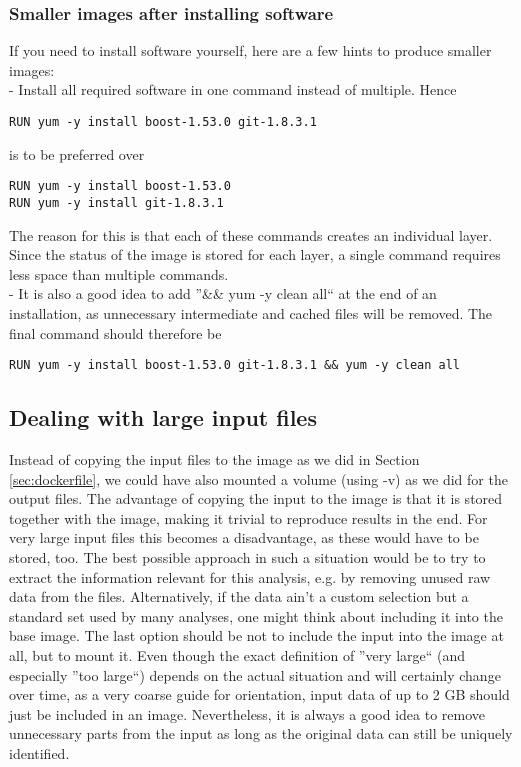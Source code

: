 \documentclass[a4paper, twoside, 11pt]{article}
\begin{document}
\subsubsection{Smaller images after installing software}
If you need to install software yourself, here are a few hints to produce smaller images: \\
- Install all required software in one command instead of multiple. Hence 
\begin{lstlisting}[basicstyle=\footnotesize\ttfamily,frame=single]
RUN yum -y install boost-1.53.0 git-1.8.3.1
\end{lstlisting}
is to be preferred over
\begin{lstlisting}[basicstyle=\footnotesize\ttfamily,frame=single]
RUN yum -y install boost-1.53.0
RUN yum -y install git-1.8.3.1
\end{lstlisting}
The reason for this is that each of these commands creates an individual layer. 
Since the status of the image is stored for each layer, a single command requires less space than multiple commands. \\
- It is also a good idea to add ''\&\& yum -y clean all`` at the end of an installation, 
as unnecessary intermediate and cached files will be removed. 
The final command should therefore be
\begin{lstlisting}[basicstyle=\footnotesize\ttfamily,frame=single]
RUN yum -y install boost-1.53.0 git-1.8.3.1 && yum -y clean all
\end{lstlisting}


\subsection{Dealing with large input files}
Instead of copying the input files to the image as we did in Section \ref{sec:dockerfile}, 
we could have also mounted a volume (using -v) as we did for the output files. 
The advantage of copying the input to the image is that it is stored together with the image, 
making it trivial to reproduce results in the end. 
For very large input files this becomes a disadvantage, as these would have to be stored, too. 
The best possible approach in such a situation would be to try to extract 
the information relevant for this analysis, e.g. by removing unused raw data from the files. 
Alternatively, if the data ain't a custom selection 
but a standard set used by many analyses, one might think about including it into the base image. 
The last option should be not to include the input into the image at all, but to mount it. 
Even though the exact definition of ''very large`` (and especially ''too large``) 
depends on the actual situation and will certainly change over time, 
as a very coarse guide for orientation, input data of up to 2 GB should just be included in an image. 
Nevertheless, it is always a good idea to remove unnecessary parts from the input 
as long as the original data can still be uniquely identified. 
\end{document}
